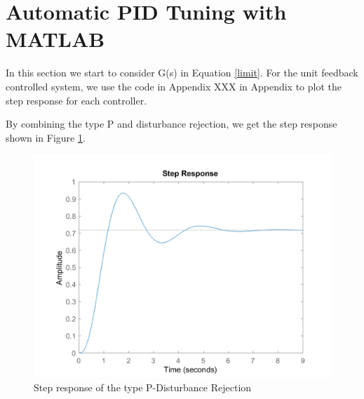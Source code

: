 \documentclass[a4paper, twocolumn, titlepage, 10pt]{article}
\begin{document}
	
		
	\section{Automatic PID Tuning with MATLAB}
	In this section we start to consider G(s) in Equation \ref{limit}. For the unit feedback controlled system, we use the code in Appendix XXX in Appendix to plot the step response for each controller.
	
	By combining the type P and disturbance rejection, we get the step response shown in Figure \ref{p-rej-step}.
   	\begin{figure}[H]
   		\centering
   		\includegraphics[width=\linewidth]{p-rej-step}
   		\caption{Step response of the type P-Disturbance Rejection}
   		\label{p-rej-step} 
   	\end{figure}
   
\end{document}
